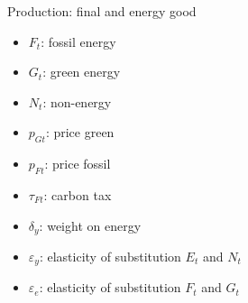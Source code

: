 \documentclass[11pt,aspectratio=169]{beamer}
\begin{document}
\begin{frame}{Production: final and energy good}
	\small
	\vspace{4mm}
	\hspace{-4mm}
	\begin{minipage}[t!]{0.24\textwidth}
		\vspace{0mm}
		\begin{itemize}	
			\item[]$F_t$: fossil energy
			\vspace{-2mm}	
			\item[]$G_t$: green energy
			\vspace{-7mm}	
			\item[]$N_t$: non-energy
		\end{itemize}
	\end{minipage}
	\begin{minipage}[t!]{0.24\textwidth}
		\vspace{0mm}
		\begin{itemize}
			\item[] $p_{Gt}$: price green  \vspace{-2mm}
			\item[] $p_{Ft}$: price fossil
			\vspace{-2mm}	
			\item[] $\tau_{Ft}$: carbon tax
		\end{itemize}
	\end{minipage}
	\begin{minipage}[t!]{0.47\textwidth}
		\vspace{0mm}
		\begin{itemize}
			\item[] $\delta_{y}$: weight on energy\vspace{-2mm}
			\item[] $\varepsilon_y$: elasticity of substitution $E_t$ and $N_t$ \vspace{-2mm}
			\item[] $\varepsilon_e$: elasticity of substitution $F_t$ and $G_t$
		\end{itemize}
	\end{minipage}
\end{frame}
\end{document}
